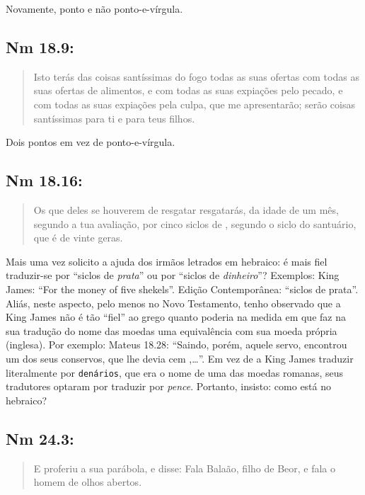 Novamente, ponto e não ponto-e-vírgula.

\subsection*{Nm 18.9:} 
\begin{quote}
    \small
Isto terás das coisas santíssimas do fogo\uwave{;} todas as suas ofertas com todas as suas ofertas de alimentos, e com todas as suas expiações pelo pecado, e com todas as suas expiações pela culpa, que me apresentarão; serão coisas santíssimas para ti e para teus filhos.
\end{quote}

Dois pontos em vez de ponto-e-vírgula.

\subsection*{Nm 18.16:} 
\begin{quote}
    \small
Os que deles se houverem de resgatar resgatarás, da idade de um mês, segundo a tua avaliação, por cinco siclos de , segundo o siclo do santuário, que é de vinte geras.
\end{quote}

Mais uma vez solicito a ajuda dos irmãos letrados em hebraico: é mais fiel traduzir-se por ``siclos de \emph{prata}'' ou por ``siclos de \emph{dinheiro}''? Exemplos: King James: ``For the money of five shekels''. Edição Contemporânea: ``siclos de prata''. Aliás, neste aspecto, pelo menos no Novo Testamento, tenho observado que a King James não é tão ``fiel'' ao grego quanto poderia na medida em que faz na
sua tradução do nome das moedas uma equivalência com sua moeda própria (inglesa). Por exemplo: Mateus 18.28: ``Saindo, porém, aquele servo, encontrou um dos seus conservos, que lhe devia cem ,\ldots''. Em vez de a King James traduzir literalmente por \texttt{denários}, que era o nome de uma das moedas
romanas, seus tradutores optaram por traduzir por \emph{pence}. Portanto, insisto: como está no hebraico?

\subsection*{Nm 24.3:} 
\begin{quote}
    \small
E proferiu a sua parábola, e disse: Fala\uwave{,} Balaão, filho de Beor, e fala o homem de olhos abertos.
\end{quote}

